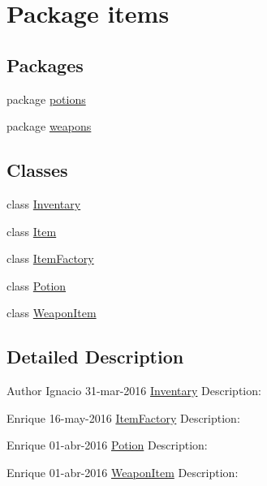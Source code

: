 \hypertarget{namespaceitems}{}\section{Package items}
\label{namespaceitems}
\subsection*{Packages}
\begin{DoxyCompactItemize}
\item 
package \mbox{\hyperlink{namespaceitems_1_1potions}{potions}}
\item 
package \mbox{\hyperlink{namespaceitems_1_1weapons}{weapons}}
\end{DoxyCompactItemize}
\subsection*{Classes}
\begin{DoxyCompactItemize}
\item 
class \mbox{\hyperlink{classitems_1_1_inventary}{Inventary}}
\item 
class \mbox{\hyperlink{classitems_1_1_item}{Item}}
\item 
class \mbox{\hyperlink{classitems_1_1_item_factory}{Item\+Factory}}
\item 
class \mbox{\hyperlink{classitems_1_1_potion}{Potion}}
\item 
class \mbox{\hyperlink{classitems_1_1_weapon_item}{Weapon\+Item}}
\end{DoxyCompactItemize}


\subsection{Detailed Description}
\begin{DoxyAuthor}{Author}
Ignacio  31-\/mar-\/2016  \mbox{\hyperlink{classitems_1_1_inventary}{Inventary}} Description\+:

Enrique  16-\/may-\/2016  \mbox{\hyperlink{classitems_1_1_item_factory}{Item\+Factory}} Description\+:

Enrique  01-\/abr-\/2016  \mbox{\hyperlink{classitems_1_1_potion}{Potion}} Description\+:

Enrique  01-\/abr-\/2016  \mbox{\hyperlink{classitems_1_1_weapon_item}{Weapon\+Item}} Description\+: 
\end{DoxyAuthor}
